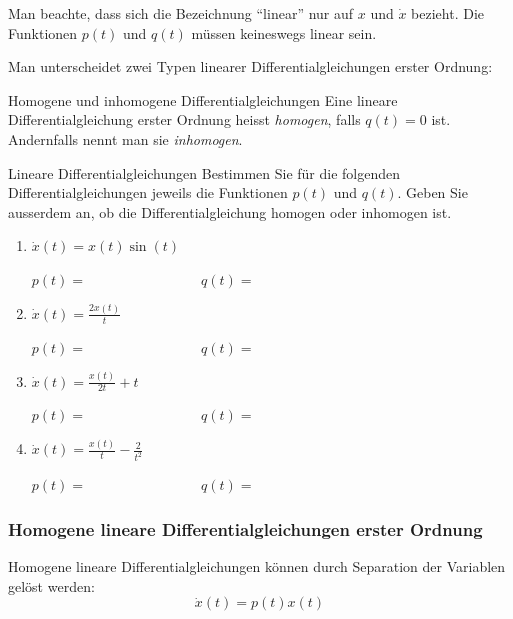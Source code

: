 Man beachte, dass sich die Bezeichnung \enquote{linear}
nur auf \(x\) und \(\dot{x}\) bezieht. Die Funktionen
\(p(t)\) und \(q(t)\) müssen keineswegs linear sein.

Man unterscheidet zwei Typen linearer Differentialgleichungen
erster Ordnung:

\begin{definition}{Homogene und inhomogene Differentialgleichungen}{}
    Eine lineare Differentialgleichung erster Ordnung heisst
    \emph{homogen}, falls \(q(t)=0\) ist.
    Andernfalls nennt man sie \emph{inhomogen}.
\end{definition}

\begin{bsp}{Lineare Differentialgleichungen}{}
    Bestimmen Sie für die folgenden Differentialgleichungen
    jeweils die Funktionen \(p(t)\) und \(q(t)\).
    Geben Sie ausserdem an, ob die Differentialgleichung
    homogen oder inhomogen ist.

    \begin{enumerate}
        \item \(\displaystyle \dot{x}(t)=x(t)\sin(t)\)

              \(p(t)=\hspace{3cm}\quad q(t)=\)

        \item \(\displaystyle \dot{x}(t)=\frac{2x(t)}{t}\)

              \(p(t)=\hspace{3cm}\quad q(t)=\)

        \item \(\displaystyle \dot{x}(t)=\frac{x(t)}{2t}+t\)

              \(p(t)=\hspace{3cm}\quad q(t)=\)

        \item \(\displaystyle \dot{x}(t)=\frac{x(t)}{t}-\frac{2}{t^2}\)

              \(p(t)=\hspace{3cm}\quad q(t)=\)
    \end{enumerate}
\end{bsp}


\subsubsection{Homogene lineare Differentialgleichungen erster Ordnung}

Homogene lineare Differentialgleichungen können durch
Separation der Variablen gelöst werden:
\[
    \dot{x}(t)=p(t)x(t)
\]

